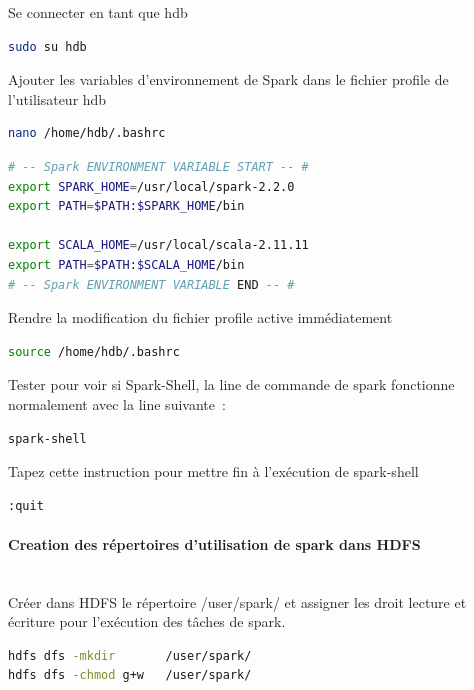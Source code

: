 \documentclass[12pt,french]{book}
\begin{document}
Se connecter en tant que hdb

\begin{lstlisting}[language=bash, frame=single]
sudo su hdb
\end{lstlisting}

Ajouter les variables d’environnement de Spark dans le fichier profile de l’utilisateur hdb

\begin{lstlisting}[language=bash, frame=single]
nano /home/hdb/.bashrc
\end{lstlisting}

\begin{lstlisting}[language=bash, frame=single]
# -- Spark ENVIRONMENT VARIABLE START -- #
export SPARK_HOME=/usr/local/spark-2.2.0
export PATH=$PATH:$SPARK_HOME/bin

export SCALA_HOME=/usr/local/scala-2.11.11
export PATH=$PATH:$SCALA_HOME/bin
# -- Spark ENVIRONMENT VARIABLE END -- #
\end{lstlisting}

Rendre la modification du fichier profile active immédiatement

\begin{lstlisting}[language=bash, frame=single]
source /home/hdb/.bashrc
\end{lstlisting}

Tester pour voir si Spark-Shell, la line de commande de spark fonctionne normalement avec la line suivante :

\begin{lstlisting}[language=bash, frame=single]
spark-shell
\end{lstlisting}

Tapez cette instruction pour mettre fin à l'exécution de spark-shell

\begin{lstlisting}[language=bash, frame=single]
:quit
\end{lstlisting}

\paragraph{Creation des répertoires d’utilisation de spark dans HDFS}\mbox{}\\

Créer dans HDFS le répertoire /user/spark/ et assigner les droit lecture et écriture pour l’exécution des tâches de spark. 

\begin{lstlisting}[language=bash, frame=single]
hdfs dfs -mkdir       /user/spark/
hdfs dfs -chmod g+w   /user/spark/
\end{lstlisting}
\end{document}
